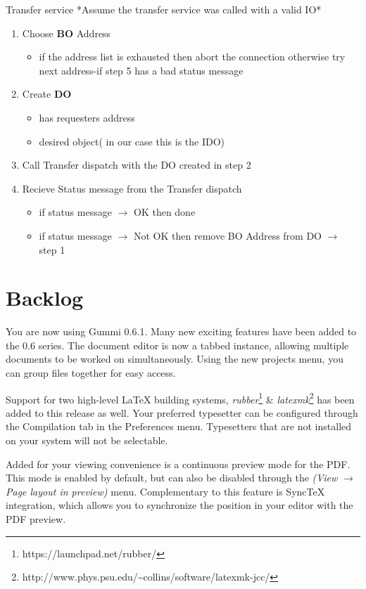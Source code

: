 \documentclass[11pt]{article}
\begin{document}
Transfer service
*Assume the transfer service was called with a valid IO*
\begin{enumerate}
  \item Choose {\bf BO } Address
  	\begin{itemize}
  	\item if the address list is exhausted then abort the connection otherwise try next address-if step 5 has a bad status message
  	\end{itemize}
  \item Create {\bf DO}
  \begin{itemize}
  	\item has requesters address
  	\item desired object( in our case this is the IDO)
  	\end{itemize}
  	\item Call Transfer dispatch with the DO created in step 2 
  	\item Recieve Status message from the Transfer dispatch
  \begin{itemize}
  	\item if status message $\rightarrow$ OK then done
  	\item if status message $\rightarrow$ Not OK then remove BO Address from DO $\rightarrow$ step 1
  	\end{itemize}  	
\end{enumerate}



\section{Backlog}



You are now using Gummi 0.6.1. Many new exciting features have been added to the 0.6 series. The document editor is now a tabbed instance, allowing multiple documents to be worked on simultaneously. Using the new projects menu, you can group files together for easy access. 

Support for two high-level {\LaTeX} building systems, \emph{rubber}\footnote{https://launchpad.net/rubber/} \& \emph{latexmk}\footnote{http://www.phys.psu.edu/{\textasciitilde}collins/software/latexmk-jcc/} has been added to this release as well. Your preferred typesetter can be configured through the Compilation tab in the Preferences menu. Typesetters that are not installed on your system will not be selectable. 

Added for your viewing convenience is a continuous preview mode for the PDF. This mode is enabled by default, but can also be disabled through the \emph{(View $\rightarrow$ Page layout in preview)} menu. Complementary to this feature is SyncTeX integration, which allows you to synchronize the position in your editor with the PDF preview. 
\end{document}
